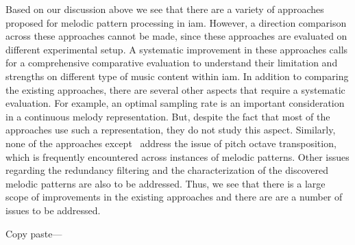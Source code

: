 {Based on our discussion above we see that there are a variety of approaches proposed for melodic pattern processing in \gls{iam}. However, a direction comparison across these approaches cannot be made, since these approaches are evaluated on different experimental setup. A systematic improvement in these approaches calls for a comprehensive comparative evaluation to understand their limitation and strengths on different type of music content within \gls{iam}. In addition to comparing the existing approaches, there are several other aspects that require a systematic evaluation. For example, an optimal sampling rate is an important consideration in a continuous melody representation. But, despite the fact that most of the approaches use such a representation, they do not study this aspect. Similarly, none of the approaches except~\cite{Rao2014} address the issue of pitch octave transposition, which is frequently encountered across instances of melodic patterns. Other issues regarding the redundancy filtering and the characterization of the discovered melodic patterns are also to be addressed. Thus, we see that there is a large scope of improvements in the existing approaches and there are are a number of issues to be addressed. 



Copy paste---


}
